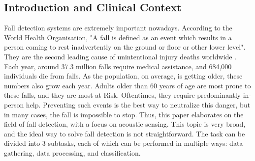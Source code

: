 \documentclass[11pt, a4paper, twoside]{article}
\begin{document}

\subsection{Introduction and Clinical Context}
\label{intro}
Fall detection systems are extremely important nowadays. According to the World Health Organisation, "A fall is defined as an event which results in a person coming to rest inadvertently on the ground or floor or other lower level". They are the second leading cause of unintentional injury deaths worldwide \cite{who2021falls}. Each year, around 37.3 million falls require medical assistance, and 684,000 individuals die from falls. As the population, on average, is getting older, these numbers also grow each year. Adults older than 60 years of age are most prone to these falls, and they are most at Risk. Oftentimes, they require predominantly in-person help. Preventing such events is the best way to neutralize this danger, but in many cases, the fall is impossible to stop. Thus, this paper elaborates on the field of fall detection, with a focus on acoustic sensing. This topic is very broad, and the ideal way to solve fall detection is not straightforward. The task can be divided into 3 subtasks, each of which can be performed in multiple ways: data gathering, data processing, and classification. 

 
\end{document}
